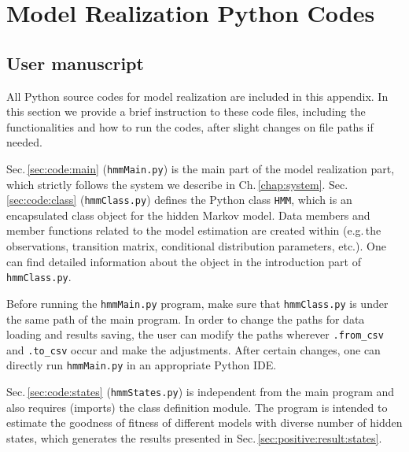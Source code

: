 \chapter{Model Realization Python Codes}
\label{app:code}


\section{User manuscript}
\label{sec:code:manuscript}
All Python source codes for model realization are included in this appendix.
In this section we provide a brief instruction to these code files,
including the functionalities and how to run the codes,
after slight changes on file paths if needed.

Sec.\,\ref{sec:code:main} (\texttt{hmmMain.py}) is the main part of the model realization part,
which strictly follows the system we describe in Ch.\,\ref{chap:system}.
Sec.\,\ref{sec:code:class} (\texttt{hmmClass.py}) defines the Python class \texttt{HMM},
which is an encapsulated class object for the hidden Markov model.
Data members and member functions related to the model estimation are created within
(e.g.\,the observations, transition matrix, conditional distribution parameters, etc.).
One can find detailed information about the object in the introduction part of \texttt{hmmClass.py}.

Before running the \texttt{hmmMain.py} program,
make sure that \texttt{hmmClass.py} is under the same path of the main program.
In order to change the paths for data loading and results saving,
the user can modify the paths wherever \texttt{.from\_csv} and \texttt{.to\_csv} occur
and make the adjustments.
After certain changes, 
one can directly run \texttt{hmmMain.py} in an appropriate Python IDE.

Sec.\,\ref{sec:code:states} (\texttt{hmmStates.py}) is independent from the main program
and also requires (imports) the class definition module.
The program is intended to estimate the goodness of fitness of different models
with diverse number of hidden states,
which generates the results presented in Sec.\,\ref{sec:positive:result:states}.


